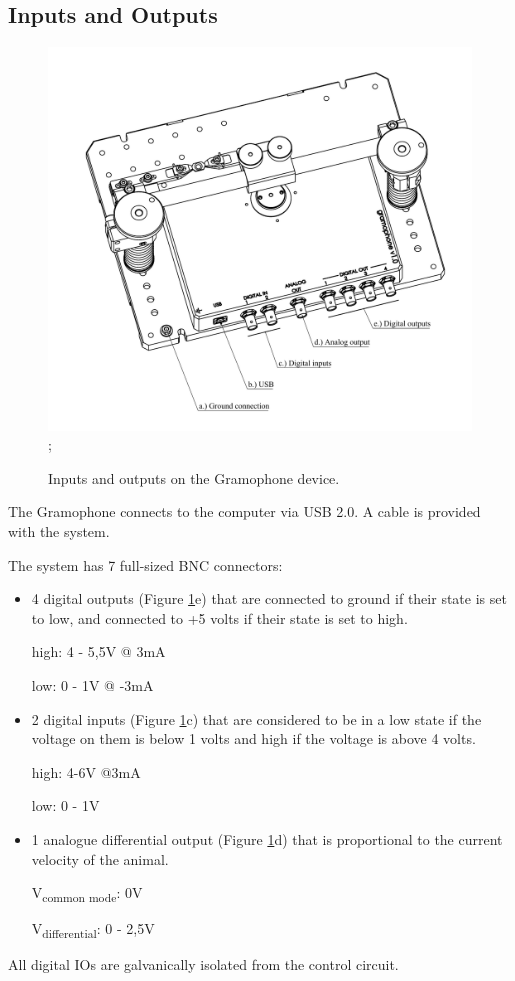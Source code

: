 \documentclass[11pt,a4paper]{article}
\begin{document}
\subsection{Inputs and Outputs}
\begin{figure}[H] %
\centering
\includegraphics[clip, trim=1cm 1cm 0cm 1cm, width=1.00\textwidth]{labels_ports.PDF};
\caption{Inputs and outputs on the Gramophone device.}
\label{fig:gram_ports}
\end{figure}

The Gramophone connects to the computer via USB 2.0. A cable is provided with the system.

The system has 7 full-sized BNC connectors:
\begin{itemize}
\item 4 digital outputs (Figure \ref{fig:gram_ports}e) that are connected to ground if their state is set to low, and connected to +5 volts if their state is set to high.

high: 4 - 5,5V @ 3mA

low:  0 - 1V   @ -3mA

\item 2 digital inputs  (Figure \ref{fig:gram_ports}c) that are considered to be in a low state if the voltage on them is below 1 volts and high if the voltage is above 4 volts. 

high: 4-6V @3mA

low:  0 - 1V


\item 1 analogue differential output (Figure \ref{fig:gram_ports}d) that is proportional to the current velocity of the animal.

V\textsubscript{common mode}:  0V

V\textsubscript{differential}: 0 - 2,5V
\end{itemize}
All digital IOs are galvanically isolated from the control circuit.
\end{document}
